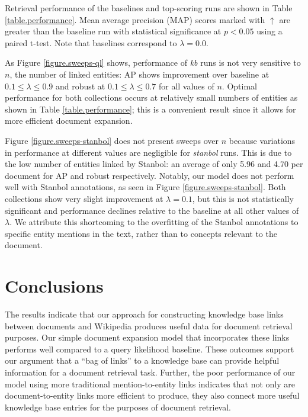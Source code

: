 \documentclass{sig-alternate}
\begin{document}
Retrieval performance of the baselines and top-scoring runs are shown in Table \ref{table.performance}. Mean average precision (MAP) scores marked with $\uparrow$ are greater than the baseline run with statistical significance at $p < 0.05$ using a paired t-test. Note that baselines correspond to $\lambda = 0.0$. 

As Figure \ref{figure.sweeps-ql} shows, performance of \textit{kb} runs is not very sensitive to $n$, the number of linked entities: AP shows improvement over baseline at $0.1 \leq \lambda \leq 0.9$ and robust at $0.1 \leq \lambda \leq 0.7$ for all values of $n$. Optimal performance for both collections occurs at relatively small numbers of entities as shown in Table \ref{table.performance}; this is a convenient result since it allows for more efficient document expansion.

Figure \ref{figure.sweeps-stanbol} does not present sweeps over $n$ because variations in performance at different values are negligible for \textit{stanbol} runs. This is due to the low number of entities linked by Stanbol: an average of only 5.96 and 4.70 per document for AP and robust respectively. Notably, our model does not perform well with Stanbol annotations, as seen in Figure \ref{figure.sweeps-stanbol}. Both collections show very slight improvement at $\lambda = 0.1$, but this is not statistically significant and performance declines relative to the baseline at all other values of $\lambda$. We attribute this shortcoming to the overfitting of the Stanbol annotations to specific entity mentions in the text, rather than to concepts relevant to the document. 

\section{Conclusions}\label{section.conclusions}

The results indicate that our approach for constructing knowledge base links between documents and Wikipedia produces useful data for document retrieval purposes. Our simple document expansion model that incorporates these links performs well compared to a query likelihood baseline. These outcomes support our argument that a ``bag of links'' to a knowledge base can provide helpful information for a document retrieval task. Further, the poor performance of our model using more traditional mention-to-entity links indicates that not only are document-to-entity links more efficient to produce, they also connect more useful knowledge base entries for the purposes of document retrieval.
\end{document}
